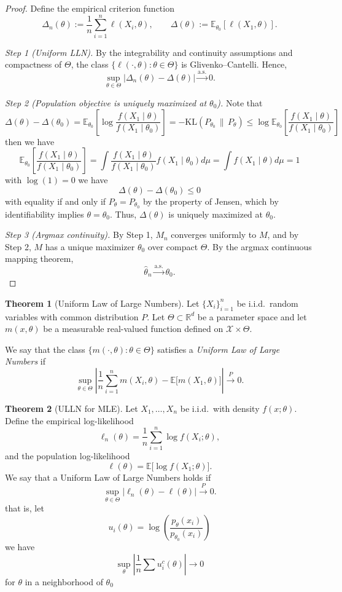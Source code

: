 \documentclass[11pt]{article}
\theoremstyle{definition}
\newtheorem{theo}{Theorem}[section]
\begin{document}
\begin{proof}
Define the empirical criterion function
\[
\Delta_n(\theta)
:= \frac{1}{n} \sum_{i=1}^n \ell(X_i, \theta),
\qquad
\Delta(\theta)
:= \mathbb{E}_{\theta_0}[\ell(X_1, \theta)].
\]

\emph{Step 1 (Uniform LLN).}
By the integrability and continuity assumptions and compactness of \(\Theta\),
the class \(\{ \ell(\cdot, \theta) : \theta \in \Theta \}\) is Glivenko--Cantelli.
Hence,
\[
\sup_{\theta \in \Theta} \big| \Delta_n(\theta) - \Delta(\theta) \big|
\xrightarrow{\text{a.s.}} 0.
\]

\emph{Step 2 (Population objective is uniquely maximized at \(\theta_0\)).}
Note that
\[
\Delta(\theta) - \Delta(\theta_0)
= \mathbb{E}_{\theta_0} \!\left[ \log \frac{f(X_1 \mid \theta)}{f(X_1 \mid \theta_0)} \right]
= - \mathrm{KL}\!\left( P_{\theta_0} \,\|\, P_\theta \right) \leq \log\mathbb{E}_{\theta_0} \!\left[ \frac{f(X_1 \mid \theta)}{f(X_1 \mid \theta_0)} \right]
\]
then we have
\[
\mathbb{E}_{\theta_0} \!\left[ \frac{f(X_1 \mid \theta)}{f(X_1 \mid \theta_0)} \right] = \int \frac{f(X_1 \mid \theta)}{f(X_1 \mid \theta_0)}f(X_1 \mid \theta_0)d\mu = \int f(X_1 \mid \theta)d\mu=1
\]
with $\log(1)=0$ we have
\[
\Delta(\theta) - \Delta(\theta_0) \leq 0
\]
with equality if and only if \(P_\theta = P_{\theta_0}\) by the property of Jensen, which by identifiability
implies \(\theta = \theta_0\).
Thus, \(\Delta(\theta)\) is uniquely maximized at \(\theta_0\).

\emph{Step 3 (Argmax continuity).}
By Step 1, \(M_n\) converges uniformly to \(M\), and by Step 2,
\(M\) has a unique maximizer \(\theta_0\) over compact \(\Theta\).
By the argmax continuous mapping theorem,
\[
\hat{\theta}_n \xrightarrow{\text{a.s.}} \theta_0.
\]
\end{proof}
\begin{theo}[Uniform Law of Large Numbers]
Let $\{X_i\}_{i=1}^n$ be i.i.d.\ random variables with common distribution $P$.
Let $\Theta \subset \mathbb{R}^d$ be a parameter space and let 
$m(x,\theta)$ be a measurable real-valued function defined on 
$\mathcal{X} \times \Theta$.

We say that the class $\{m(\cdot,\theta) : \theta \in \Theta\}$ 
satisfies a \emph{Uniform Law of Large Numbers} if
\[
\sup_{\theta \in \Theta}
\left|
\frac{1}{n}\sum_{i=1}^n m(X_i,\theta)
-
\mathbb{E}\big[m(X_1,\theta)\big]
\right|
\xrightarrow{P} 0.
\]
\end{theo}
\begin{theo}[ULLN for MLE]
Let $X_1,\dots,X_n$ be i.i.d.\ with density $f(x;\theta)$.
Define the empirical log-likelihood
\[
\ell_n(\theta)
=
\frac{1}{n}\sum_{i=1}^n \log f(X_i;\theta),
\]
and the population log-likelihood
\[
\ell(\theta)
=
\mathbb{E}\big[\log f(X_1;\theta)\big].
\]
We say that a Uniform Law of Large Numbers holds if
\[
\sup_{\theta \in \Theta}
\left|
\ell_n(\theta) - \ell(\theta)
\right|
\xrightarrow{P} 0.
\]
that is, let
\[
u_i(\theta) = \log(\frac{p_{\theta}(x_i)}{p_{\theta_0}(x_i)})
\]
we have
\[
\sup_{\theta}|\frac{1}{n}\sum u_i^c(\theta)|\rightarrow 0
\]
for $\theta$ in a neighborhood of $\theta_0$
\end{theo}
\end{document}
